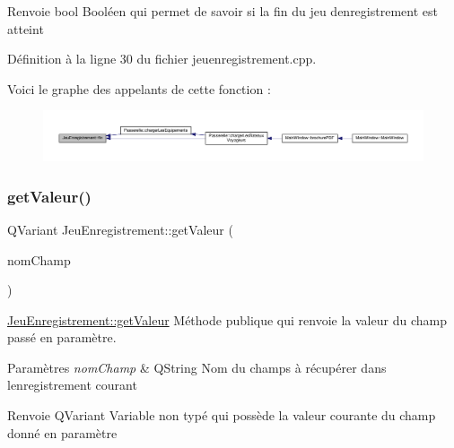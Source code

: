 \begin{DoxyReturn}{Renvoie}
bool Booléen qui permet de savoir si la fin du jeu d\textquotesingle{}enregistrement est atteint 
\end{DoxyReturn}


Définition à la ligne 30 du fichier jeuenregistrement.\+cpp.

Voici le graphe des appelants de cette fonction \+:\nopagebreak
\begin{figure}[H]
\begin{center}
\leavevmode
\includegraphics[width=350pt]{class_jeu_enregistrement_af8d23fbc407926e8578986a3e950bdd9_icgraph}
\end{center}
\end{figure}
\mbox{\label{class_jeu_enregistrement_aa19979b7af9747ae05e8e40f7747bbed}} 
\subsubsection{\texorpdfstring{get\+Valeur()}{getValeur()}}
{\footnotesize\ttfamily Q\+Variant Jeu\+Enregistrement\+::get\+Valeur (\begin{DoxyParamCaption}\item[{Q\+String}]{nom\+Champ }\end{DoxyParamCaption})}



\hyperlink{class_jeu_enregistrement_aa19979b7af9747ae05e8e40f7747bbed}{Jeu\+Enregistrement\+::get\+Valeur} Méthode publique qui renvoie la valeur du champ passé en paramètre. 


\begin{DoxyParams}{Paramètres}
{\em nom\+Champ} & Q\+String Nom du champs à récupérer dans l\textquotesingle{}enregistrement courant \\
\hline
\end{DoxyParams}
\begin{DoxyReturn}{Renvoie}
Q\+Variant Variable non typé qui possède la valeur courante du champ donné en paramètre 
\end{DoxyReturn}



